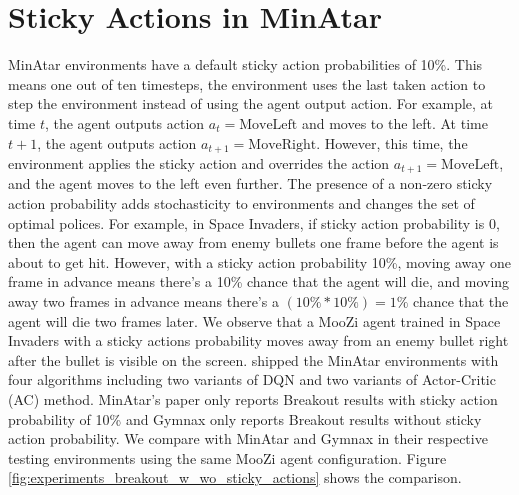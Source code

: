 
\section{Sticky Actions in MinAtar} \label{sec:sticky_minatar}
MinAtar environments have a default sticky action probabilities of 10\%.
This means one out of ten timesteps, the environment uses the last taken action to step the environment instead of using the agent output action.
For example, at time $t$, the agent outputs action $a_t = \text{MoveLeft}$ and moves to the left.
At time $t+1$, the agent outputs action $a_{t+1} = \text{MoveRight}$.
However, this time, the environment applies the sticky action and overrides the action $a_{t+1} = \text{MoveLeft}$, and the agent moves to the left even further.
The presence of a non-zero sticky action probability adds stochasticity to environments and changes the set of optimal polices.
For example, in Space Invaders, if sticky action probability is 0, then the agent can move away from enemy bullets one frame before the agent is about to get hit.
However, with a sticky action probability 10\%, moving away one frame in advance means there's a 10\% chance that the agent will die, and moving away two frames in advance means there's a $(10\% * 10\%) = 1\%$ chance that the agent will die two frames later.
We observe that a MooZi agent trained in Space Invaders with a sticky actions probability moves away from an enemy bullet right after the bullet is visible on the screen.
\citeauthor{MinAtarAtariInspiredTestbed_Young.Tian_2019} shipped the MinAtar environments with four algorithms including two variants of DQN and two variants of Actor-Critic (AC) method.
MinAtar's paper only reports Breakout results with sticky action probability of 10\% and Gymnax only reports Breakout results without sticky action probability.
We compare with MinAtar and Gymnax in their respective testing environments using the same MooZi agent configuration.
Figure \ref{fig:experiments_breakout_w_wo_sticky_actions} shows the comparison.

